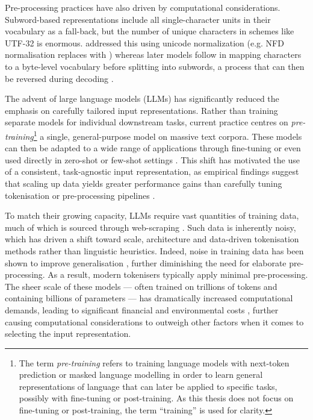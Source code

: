 Pre-processing practices have also driven by computational considerations. Subword-based representations include all single-character units in their vocabulary as a fall-back, but the number of unique characters in schemes like UTF-32 is enormous. \bert addressed this using unicode normalization (e.g. NFD normalisation replaces  with ) whereas later models follow \gpt \citep{radford-2019-gpt2} in mapping characters to a byte-level vocabulary before splitting into subwords, a process that can then be reversed during decoding \citep{wang2020neural}.  

The advent of large language models (LLMs) has significantly reduced the emphasis on carefully tailored input representations. Rather than training separate models for individual downstream tasks, current practice centres on \emph{pre-training}\footnote{The term \emph{pre-training} refers to training language models with next-token prediction or masked language modelling in order to learn general representations of language that can later be applied to specific tasks, possibly with fine-tuning or post-training. As this thesis does not focus on fine-tuning or post-training, the term ``training'' is used for clarity.} a single, general-purpose model on massive text corpora. These models can then be adapted to a wide range of applications through fine-tuning or even used directly in zero-shot or few-shot settings \citep{raffel2020exploring}. This shift has motivated the use of a consistent, task-agnostic input representation, as empirical findings suggest that scaling up data yields greater performance gains than carefully tuning tokenisation or pre-processing pipelines \citep{brown-2020-gpt3}. 

To match their growing capacity, LLMs require vast quantities of training data, much of which is sourced through web-scraping \citep{bansal-2022-datascaling}. Such data is inherently noisy, which has driven a shift toward scale, architecture and data-driven tokenisation methods rather than linguistic heuristics. Indeed, noise in training data has been shown to improve generalisation \citep{zheng-saparov-2023-noisy}, further diminishing the need for elaborate pre-processing. As a result, modern tokenisers typically apply minimal pre-processing. The sheer scale of these models --- often trained on trillions of tokens and containing billions of parameters --- has dramatically increased computational demands, leading to significant financial and environmental costs \citep{strubell-etal-2019-energy, patterson2021carbonemissionslargeneural, bender2021parrots, luccioni2022estimatingcarbonfootprintbloom}, further causing computational considerations to outweigh other factors when it comes to selecting the input representation. 

